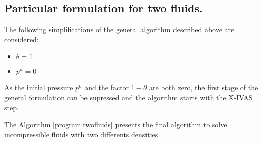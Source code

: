 \subsection{Particular formulation for two fluids.}
The following simplifications of the general algorithm described above are considered:

\begin{itemize}
  \item $\theta=1$
  \item $p^n=0$
\end{itemize}

As the initial pressure $p^n$ and the factor $1-\theta$ are both zero, the first stage of the general formulation can be supressed and the algorithm starts with the X-IVAS step.

The Algorithm \ref{program:twofluids} presents the final algorithm to solve incompressible fluids with two differents densities


